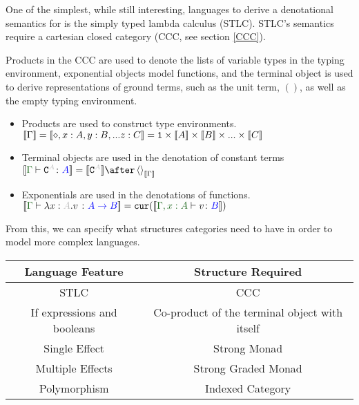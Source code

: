 \documentclass{Report}
\begin{document}
One of the simplest, while still interesting, languages to derive a denotational semantics for is the simply typed lambda calculus (STLC). STLC's semantics require a cartesian closed category (CCC, see section \ref{CCC}).

Products in the CCC are used to denote the lists of variable types in the typing environment, exponential objects model functions, and the terminal object is used to derive representations of ground terms, such as the unit term, $()$, as well as the empty typing environment.

\begin{itemize}
    \item Products are used to construct type environments. $\deno{\G} = \deno{\nil, x: A, y:B, ... z:C} = \1 \times \deno{A} \times \deno{B} \times ... \times \deno{C}$
    \item Terminal objects are used in the denotation of constant terms $\deno{\gtyperelation{\const{A}}{A}} = \deno{\const{A}}\after\term{\deno{\G}}$
    \item Exponentials are used in the denotations of functions. $\deno{\typerelation{\G}{\lam{x}{A}{v}}{\ab}} = \cur{\deno{\typerelation{\gax}{v}{B}}}$
\end{itemize}

From this, we can specify what structures categories need to have in order to model more complex languages.
\begin{center}
    \begin{tabular}{|c|c|}
        \hline
        Language Feature & Structure Required \\
        \hline
        \hline
        STLC            & CCC \\
        \hline
        If expressions and booleans   & Co-product of the terminal object with itself \\
        \hline
        Single Effect   & Strong Monad \\
        \hline
        Multiple Effects & Strong Graded Monad \\
        \hline
        Polymorphism & Indexed Category \\
        \hline
    \end{tabular}
\end{center}
\end{document}
